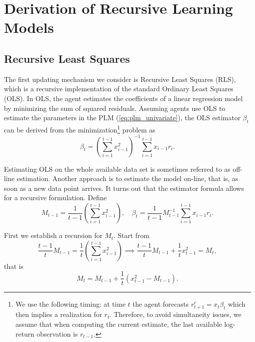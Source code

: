 \documentclass[11pt]{article}
\begin{document}

\newpage



\appendix

\section{Derivation of Recursive Learning Models}\label{sec:appendix_learning}
\subsection{Recursive Least Squares}\label{app:RLS}

The first updating mechanism we consider is Recursive Least Squares (RLS), which is a recursive implementation of the standard Ordinary Least Squares (OLS).
In OLS, the agent estimates the coefficients of a linear regression model by minimizing the sum of squared residuals.
Assuming agents use OLS to estimate the parameters in the PLM (\ref{eq:plm_univariate}), the OLS estimator $\beta_t$ can be derived from the minimization\footnote{
We use the following timing:
at time $t$ the agent forecasts $r^e_{t+1} = x_t \beta_{t}$ which then implies a realization for $r_t$. 
Therefore, to avoid simultaneity issues, we assume that when computing the current estimate, the last available log-return observation is $r_{t-1}$.
} problem as
\begin{equation}
     \beta_t = \left(\sum^{t-1}_{i=1}  x_{i-1}^2 \right)^{-1} \sum^{t-1}_{i=1}  x_{i-1} r_i.
\end{equation}

Estimating OLS on the whole available data set is sometimes referred to as off-line estimation. 
Another approach is to estimate the model on-line, that is, as soon as a new data point arrives. 
It turns out that the estimator formula allows for a recursive formulation.
Define 
\begin{equation}
M_{t-1} = \frac{1}{t-1}  \left(\sum^{t-1}_{i=1}  x_{i-1}^2 \right), \quad \beta_t = \frac{1}{t-1} M^{-1}_{t-1} \sum^{t-1}_{i=1}  x_{i-1} r_i.
\end{equation}

First we establish a recursion for $M_t$. Start from 
\begin{equation}
\frac{t-1}{t} M_{t-1} = \frac{1}{t}  \left(\sum^{t-1}_{i=1}  x_{i-1}^2 \right) \implies \frac{t-1}{t} M_{t-1} + \frac{1}{t} x_{t-1}^2 = M_t,
\end{equation}
that is
\begin{equation}
    M_t = M_{t-1} + \frac{1}{t} \left(x_{t-1}^2 - M_{t-1} \right).
\end{equation}
\end{document}
